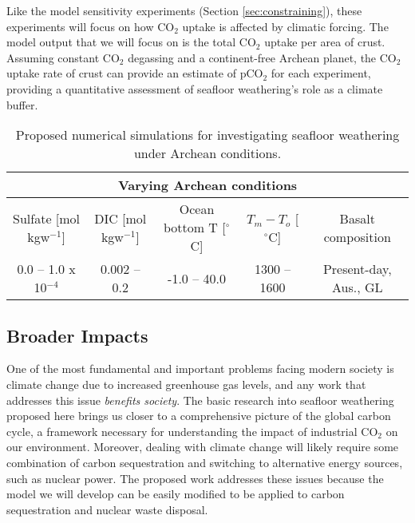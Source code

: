 \documentclass[authoryear,round,12pt]{article}
\begin{document}
Like the model sensitivity experiments (Section \ref{sec:constraining}), these
experiments will focus on how CO$_2$ uptake is affected by climatic
forcing. The model output that we will focus on is the total CO$_2$
uptake per area of crust. Assuming constant CO$_2$ degassing and a
continent-free Archean planet, the CO$_2$ uptake rate of crust can
provide an estimate of pCO$_2$ for each experiment, providing a
quantitative assessment of seafloor weathering's role as a climate
buffer.

\begin{table}[h!]

\caption{Proposed numerical simulations for investigating seafloor weathering under Archean conditions.\\} 
\centering
\begin{tabular}{c|c|c|c|c} 

\hline  
\hline
 \multicolumn{5}{c}{\cellcolor{grey!25}Varying Archean conditions}\\
 \hline
Sulfate [mol kgw$^{-1}$]  & DIC [mol kgw$^{-1}$] & Ocean bottom T [$^{\circ}$C] & $T_m - T_o$ [$^{\circ}$C] & Basalt composition \\
\hline
0.0 -- 1.0 x 10$^{-4}$ & 0.002 -- 0.2 & -1.0 -- 40.0 & 1300 -- 1600  & Present-day, Aus., GL \\
\hline      
\end{tabular}
\label{tab:archean}
\end{table}





\subsection{Broader Impacts}
\label{sec:outreach}

One of the most fundamental and important problems facing modern
society is climate change due to increased greenhouse gas levels, and
any work that addresses this issue \textit{benefits society}.  The
basic research into seafloor weathering proposed here brings us closer
to a comprehensive picture of the global carbon cycle, a framework
necessary for understanding the impact of industrial CO$_2$ on our
environment. Moreover, dealing with climate change will likely require
some combination of carbon sequestration and switching to alternative
energy sources, such as nuclear power. The proposed work addresses
these issues because the model we will develop can be easily modified
to be applied to carbon sequestration and nuclear waste disposal.
\end{document}
